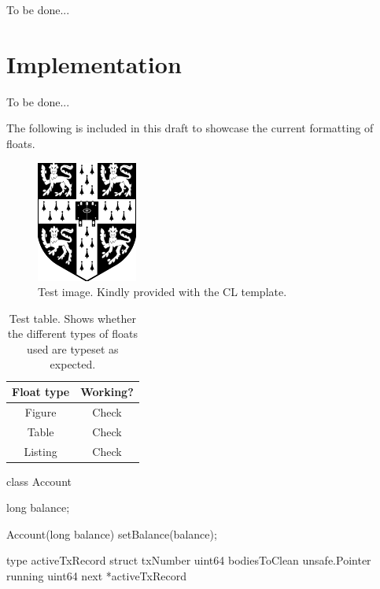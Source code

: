 \documentclass[12pt,a4paper,twoside,openright]{report}
\newcommand{\mycaption}[2]{\caption[#1]{#1 #2}}
\newcommand{\TOBEDONE}{{\LARGE To be done...}}
\newcommand{\javaClass}[1]{\texttt{#1}}
\newcommand{\javaMethod}[1]{\texttt{#1}}
\newcommand{\goType}[1]{\texttt{#1}}
\begin{document}
\TOBEDONE

\chapter{Implementation}

\TOBEDONE

The following is included in this draft to showcase the current
formatting of floats.

\begin{figure}[h]
  \centering \includegraphics{cuarms.pdf} \mycaption{Test
    image.}{Kindly provided with the CL template.}
\end{figure}

\begin{table}[h]
  \centering
  \begin{tabular}{| c | c |}
    \hline
    Float type & Working? \\
    \hline
    Figure & Check \\
    Table & Check \\
    Listing & Check \\
    \hline
  \end{tabular}
  \mycaption{Test table.}{Shows whether the different types of floats
    used are typeset as expected.}
\end{table}

\begin{Listing}
  \begin{JavaCode}
    class Account { long balance;
      
      Account(long balance) { setBalance(balance); } }
  \end{JavaCode}
  \mycaption{A non-thread-safe class \javaClass{Account} in Java with
    the basic \javaMethod{getBalance}, \javaMethod{deposit}, and
    \javaMethod{withdraw} operations.}{Some extra stuff here.}
  \label{lst:account}
\end{Listing}

\begin{Listing}
  \begin{GoCode}
    type activeTxRecord struct { txNumber uint64 bodiesToClean
      unsafe.Pointer running uint64 next *activeTxRecord }
  \end{GoCode}
  \mycaption{Example Go code.}{The \goType{activeTxRecord} type.}
  \label{lst:account}
\end{Listing}
\end{document}
